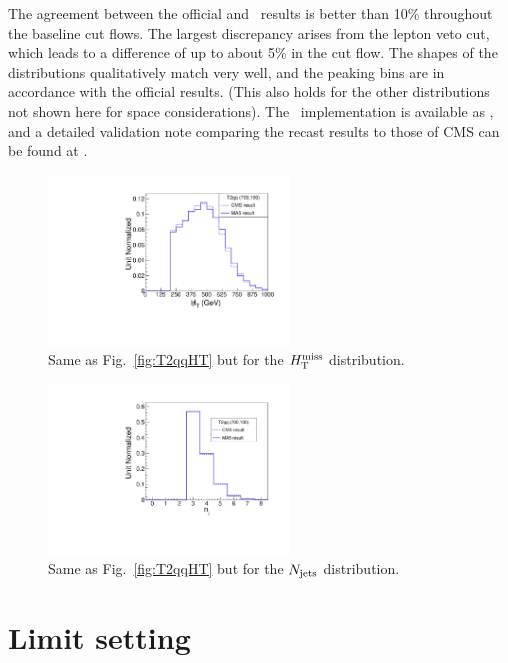 The agreement between the official and \ma\ results is better than 10\% throughout the baseline cut flows. The largest discrepancy arises from the lepton veto cut, which leads to a difference of up to about 5\% in the cut flow. The shapes of the distributions qualitatively match very well, and the peaking bins are in accordance with the official results. (This also holds for the other distributions not shown here for space considerations). 
The \ma\ implementation is available as \cite{MA5-CMS-SUS-13-012}, and 
a detailed validation note comparing the recast results to those of CMS can be found at \cite{ma5wiki}. 


\begin{figure}
\centering
\includegraphics[width=6.4cm]{figures/madanalysis5/cms-012-T2qqMHT.pdf}
\caption{Same as Fig.~\ref{fig:T2qqHT} but for the $H_{\text{T}}^{\rm miss}$ distribution.}
\label{fig:T2qqMHT}
\end{figure}


\begin{figure}
\centering
\includegraphics[width=6.4cm]{figures/madanalysis5/cms-012-T2qqNJets.pdf}
\caption{Same as Fig.~\ref{fig:T2qqHT} but for the $N_{\rm jets}$ distribution.}
\label{fig:T2qqNJets}
\end{figure}


\section{Limit setting}\label{sec:CLprocedure}



